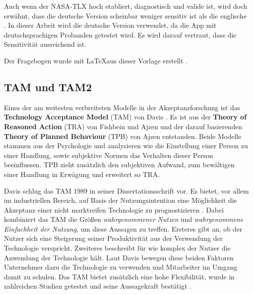 Auch wenn der NASA-TLX hoch etabliert, diagnostisch und valide ist, wird doch erwähnt, dass die deutsche Version scheinbar weniger sensitiv ist als die englische \cite{horold_faktor_2015}. In dieser Arbeit wird die deutsche Version verwendet, da die App mit deutschsprachigen Probanden getestet wird. Es wird darauf vertraut, dass die Sensitivität ausreichend ist. 

Der Fragebogen wurde mit \LaTeX  aus dieser Vorlage erstellt \cite{https://doi.org/10.13140/rg.2.2.26978.79044}.

\subsection{TAM und TAM2}

Eines der am weitesten verbreiteten Modelle in der Akzeptanzforschung ist das \textbf{Technology Acceptance Model} (TAM) von Davis \cite{davis_perceived_1989}. Es ist aus der \textbf{Theory of Reasoned Action} (TRA) von Fishbein und Ajzen \cite{fishbein_belief_1975} und der darauf basierenden \textbf{Theory of Planned Behaviour} (TPB) von Ajzen \cite{ajzen_theory_1991} entstanden. Beide Modelle stammen aus der Psychologie und analysieren wie die Einstellung einer Person zu einer Handlung, sowie subjektive Normen das Verhalten dieser Person beeinflussen. TPB zieht zusätzlich den subjektiven Aufwand, zum bewältigen einer Handlung in Erwägung und erweitert so TRA. 

Davis schlug das TAM 1989 in seiner Dissertationsschrift vor. Es bietet, vor allem im industriellen Bereich, auf Basis der Nutzungsintention eine Möglichkeit die Akzeptanz einer nicht marktreifen Technologie zu prognostizieren \cite{wilhelm_nutzerakzeptanz_nodate}. Dabei kombiniert das TAM die Größen \textit{wahrgenommener Nutzen} und \textit{wahrgenommene Einfachheit der Nutzung}, um diese Aussagen zu treffen. Ersteres gibt an, ob der Nutzer sich eine Steigerung seiner Produktivität aus der Verwendung der Technologie verspricht. Zweiteres beschreibt für wie komplex der Nutzer die Anwendung der Technologie hält. Laut Davis bewegen diese beiden Faktoren Unternehmer dazu die Technologie zu verwenden und Mitarbeiter im Umgang damit zu schulen. Das TAM bietet zusätzlich eine hohe Flexibilität, wurde in zahlreichen Studien getestet und seine Aussagekraft bestätigt \cite{university_of_arkansas_dead_2007}.


